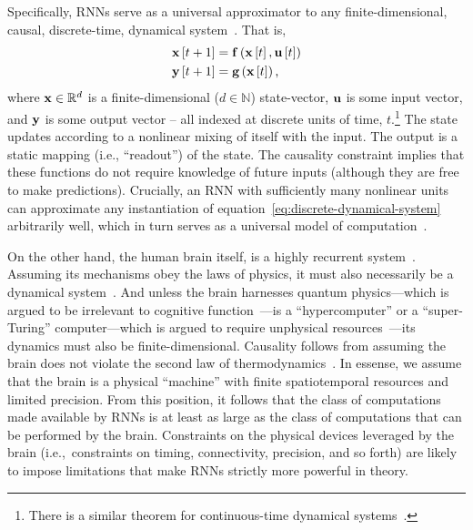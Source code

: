 Specifically, RNNs serve as a universal approximator to any finite-dimensional, causal, discrete-time, dynamical system~\citep{schafer2006recurrent}.
That is,
\begin{equation}
\begin{aligned} \label{eq:discrete-dynamical-system}
\mathbf{x}\left[ t + 1 \right] &= \mathbf{f}\left(\mathbf{x}\left[ t \right], \mathbf{u}\left[ t \right] \right) \\
\mathbf{y}\left[ t + 1 \right] &= \mathbf{g}\left(\mathbf{x}\left[ t \right] \right) \text{,}
\end{aligned}
\end{equation}
where $\mathbf{x} \in \mathbb{R}^d$ is a finite-dimensional ($d \in \mathbb{N}$) state-vector, $\mathbf{u}$ is some input vector, and $\mathbf{y}$ is some output vector -- all indexed at discrete units of time, $t$.\footnote{
There is a similar theorem for continuous-time dynamical systems~\citep{funahashi1993approximation, bennett1995universal}.
}
The state updates according to a nonlinear mixing of itself with the input.
The output is a static mapping (i.e., ``readout'') of the state.
The causality constraint implies that these functions do not require knowledge of future inputs (although they are free to make predictions).
Crucially, an RNN with sufficiently many nonlinear units can approximate any instantiation of equation~\ref{eq:discrete-dynamical-system} arbitrarily well, which in turn serves as a universal model of computation~\citep{turing1938computable}.

On the other hand, the human brain itself, is a highly recurrent system~\citep{dayan2001theoretical}.
Assuming its mechanisms obey the laws of physics, it must also necessarily be a dynamical system~\citep{amit1989modeling, mckenna1994brain, port1995mind}.
And unless the brain harnesses quantum physics---which is argued to be irrelevant to cognitive function~\citep{litt2006brain}---is a ``hypercomputer'' or a ``super-Turing'' computer---which is argued to require unphysical resources~\citep{broersma2018computability}---its dynamics must also be finite-dimensional.
Causality follows from assuming the brain does not violate the second law of thermodynamics~\citep{evans1996causality}.
In essense, we assume that the brain is a physical ``machine'' with finite spatiotemporal resources and limited precision.
From this position, it follows that the class of computations made available by RNNs is at least as large as the class of computations that can be performed by the brain.
Constraints on the physical devices leveraged by the brain (i.e.,~constraints on timing, connectivity, precision, and so forth) are likely to impose limitations that make RNNs strictly more powerful in theory.

